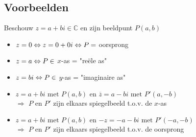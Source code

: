 \documentclass[12pt,twoside,a4]{article}
\begin{document}
\subsection{Voorbeelden}

Beschouw $z=a+bi\in\mathbb{C}$ en zijn beeldpunt $P(a,b)$

\begin{itemize}
  \item $z=0 \Leftrightarrow z=0+0i \Leftrightarrow P=$ oorsprong
  \item $z=a \Leftrightarrow P\in $ $x$-as = "reële as"
  \item $z=bi \Leftrightarrow P\in $ $y$-as = "imaginaire as"
  \item $z=a+bi \text{ met } P(a,b)$ en $\overline{z}=a-bi \text{ met } P'(a,-b)$\\
  $\Rightarrow$ $P$ en $P'$ zijn elkaars spiegelbeeld t.o.v. de $x$-as
  \item $z=a+bi \text{ met } P(a,b)$ en $-z=-a-bi \text{ met } P'(-a,-b)$\\
  $\Rightarrow$ $P$ en $P'$ zijn elkaars spiegelbeeld t.o.v. de oorsprong
\end{itemize}
\end{document}
